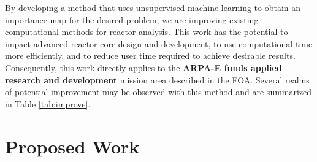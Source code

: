 \documentclass[letterpaper,12pt]{article}
\begin{document}
By developing a method that uses unsupervised machine learning to obtain an
importance map for the desired problem, we are improving existing computational
methods for reactor analysis. This work has the potential to
impact advanced reactor core design and development, to use computational time
more efficiently, and to reduce user time required to achieve desirable results.
Consequently, this work
directly applies to the \textbf{ARPA-E funds applied research and development}
mission area described in the FOA. Several realms of potential improvement may
be observed with this method and are summarized in Table \ref{tab:improve}.



\section{Proposed Work}
\end{document}
